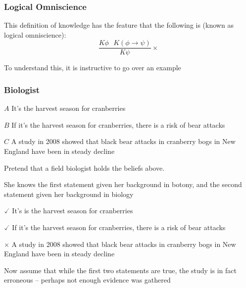 \begin{frame}
\frametitle{Logical Omniscience}
\begin{itemizedot}
  \item This definition of knowledge has the feature that the following is
   (known as logical omniscience):
  \[ \frac{K \phi \text{ \ \ \ } K (\phi \rightarrow \psi)}{K \psi}
  \times \]
\item To understand this, it is instructive to go over an example
\end{itemizedot}
\end{frame}
\begin{frame}[allowframebreaks]
\frametitle{Biologist}

  \begin{itemizeminus}
    \item[$A$ ] It's the harvest season for cranberries
    
    \item[$B$ ] If it's the harvest season for cranberries, there is a risk of
    bear attacks
    
    \item[$C$ ] A study in 2008 showed that black bear attacks in cranberry bogs
    in New England have been in steady decline
  \end{itemizeminus}

Pretend that a field biologist holds the beliefs above.

  She knows the first statement given her background in
  botony, and the second statement given her background in biology

\framebreak

  \begin{itemizeminus}
    \item[$\checked$ ] It's is the harvest season for cranberries
    
    \item[$\checked$ ] If it's the harvest season for cranberries, there is a
    risk of bear attacks
    
    \item[$\times$ ] A study in 2008 showed that black bear attacks in cranberry
    bogs in New England have been in steady decline
  \end{itemizeminus}
Now assume that while the first two statements are true, the study
  is in fact erroneous -- perhaps not enough evidence was
  gathered


\end{frame}
